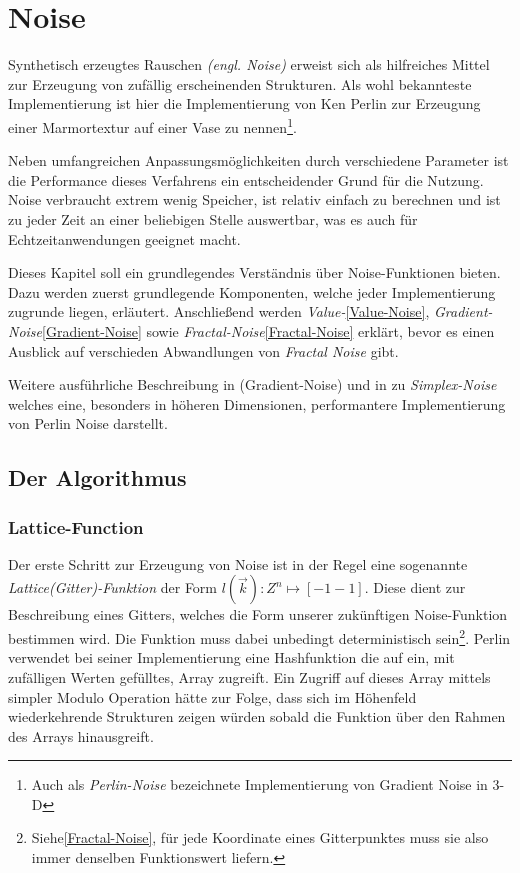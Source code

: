 \chapter{Noise}\label{Noise}
Synthetisch erzeugtes Rauschen \emph{(engl. Noise)} erweist sich als hilfreiches Mittel zur Erzeugung von zufällig erscheinenden Strukturen.
Als wohl bekannteste Implementierung ist hier die Implementierung von Ken Perlin\cite{PERLIN1985} zur Erzeugung einer Marmortextur auf einer Vase zu nennen\footnote{Auch als \emph{Perlin-Noise} bezeichnete Implementierung von Gradient Noise in 3-D}.

Neben umfangreichen Anpassungsmöglichkeiten durch verschiedene Parameter ist die Performance dieses Verfahrens ein entscheidender Grund für die Nutzung. Noise verbraucht extrem wenig Speicher, ist relativ einfach zu berechnen und ist zu jeder Zeit an einer beliebigen Stelle auswertbar, was es auch für Echtzeitanwendungen geeignet macht.\cite{H.Hauser2010}

Dieses Kapitel soll ein grundlegendes Verständnis über Noise-Funktionen bieten. Dazu werden zuerst grundlegende Komponenten, welche jeder Implementierung zugrunde liegen, erläutert. Anschließend werden \emph{Value-}\ref{Value-Noise}, \emph{Gradient-Noise}\ref{Gradient-Noise} sowie \emph{Fractal-Noise}\ref{Fractal-Noise} erklärt, bevor es einen Ausblick auf verschieden Abwandlungen von \emph{Fractal Noise} gibt.

Weitere ausführliche Beschreibung in \cite{BurgerGradientNoise2008} (Gradient-Noise) und in \cite{simplexNoise} zu \emph{Simplex-Noise} welches eine, besonders in höheren Dimensionen, performantere Implementierung von Perlin Noise darstellt.

\section{Der Algorithmus}
\subsection{Lattice-Function}\label{latticeFunc}
Der erste Schritt zur Erzeugung von Noise ist in der Regel eine sogenannte \emph{Lattice(Gitter)-Funktion}\cite{fractalsAndChaos} der Form \begin{math}l(\vec{k}): {Z}^n \mapsto [-1 - 1]\end{math}\label{latticeFunc}.
Diese dient zur Beschreibung eines Gitters, welches die Form unserer zukünftigen Noise-Funktion bestimmen wird. Die Funktion muss dabei unbedingt deterministisch sein\footnote{Siehe\ref{Fractal-Noise}, für jede Koordinate eines Gitterpunktes muss sie also immer denselben Funktionswert liefern.}. Perlin verwendet bei seiner Implementierung eine Hashfunktion die auf ein, mit zufälligen Werten gefülltes, Array zugreift. %
 Ein Zugriff auf dieses Array mittels simpler Modulo Operation hätte zur Folge, dass sich im Höhenfeld wiederkehrende Strukturen zeigen würden sobald die Funktion über den Rahmen des Arrays hinausgreift.


